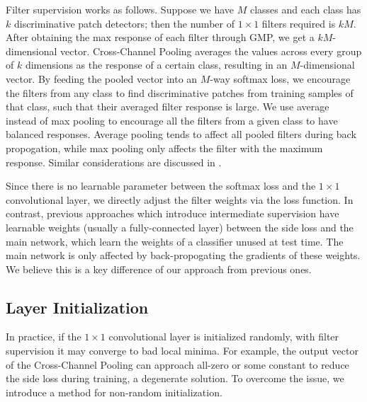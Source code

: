 \documentclass[10pt,twocolumn,letterpaper]{article}
\begin{document}
Filter supervision works as follows. Suppose we have $M$ classes and each class has $k$ discriminative patch
detectors; then the number of $1\times1$ filters required is $kM$. After obtaining the max response of each filter through
GMP, we get a $kM$-dimensional vector. Cross-Channel Pooling averages the values across every group of $k$
dimensions as the response of a certain class, resulting in an $M$-dimensional vector. By feeding the pooled vector into
an $M$-way softmax loss, we encourage
the filters from any class to find discriminative patches from training samples of that class, such that their
averaged filter response is large. We use average instead of max
pooling to encourage all the filters from a given class to have balanced responses. Average pooling tends
to affect all pooled filters during back propogation, while max pooling only affects the filter with the maximum response.
Similar considerations are discussed in \cite{bolei}.

Since there is no learnable parameter between the softmax loss and the $1\times1$
convolutional layer, we directly adjust the
filter weights via the loss function. 
In contrast, previous approaches which introduce intermediate supervision \cite{dsn, lcnn, cite_lcnn} have learnable
weights (usually a fully-connected layer)
between the side loss and the main network, which learn the weights of a classifier unused at test time. The
main network is only affected by back-propogating the gradients of these weights. We believe this is a key difference
of our approach from previous ones.

\subsection{Layer Initialization} \label{sec3_4}
In practice, if
the $1\times1$ convolutional layer is initialized randomly, with filter supervision it may converge to bad local minima. For
example, the output vector of the Cross-Channel Pooling can 
approach all-zero or some constant to reduce the side loss during training, a degenerate solution. To overcome the
issue, we introduce a method for non-random initialization.
\end{document}
